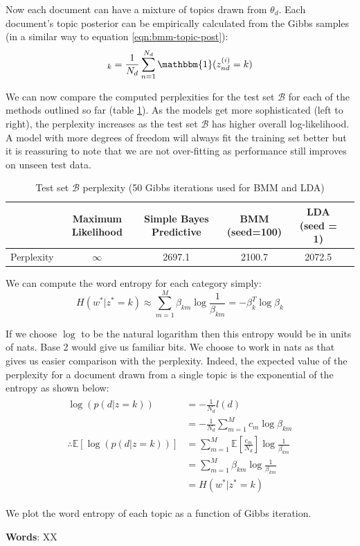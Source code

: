 \documentclass[]{article}
\newcommand{\Bcal}{\mathcal{B}}
\newcommand{\Expect}{\mathbb{E}}
\begin{document}
Now each document can have a mixture of topics drawn from $\theta_d$. Each document's topic posterior can be empirically calculated from the Gibbs samples (in a similar way to equation \ref{eqn:bmm-topic-post}):
%
\begin{equation}
	[\theta^{(i)}_d]_k = \frac{1}{N_d} \sum_{n=1}^{N_d} \mathbbm{1}(z^{(i)}_{nd} = k)
\end{equation}

We can now compare the computed perplexities for the test set $\Bcal$ for each of the methods outlined so far (table \ref{tab:perplex-comp}). As the models get more sophisticated (left to right), the perplexity increases as the test set $\Bcal$ has higher overall log-likelihood. A model with more degrees of freedom will always fit the training set better but it is reassuring to note that we are not over-fitting as performance still improves on unseen test data.

\begin{table}[!h]
	\centering
	\begin{tabular}{c | c c c c c}
		& Maximum Likelihood & Simple Bayes Predictive & BMM (seed=100) & LDA (seed = 1) \\ \hline
		Perplexity & $\infty$ & 2697.1 & 2100.7 & 2072.5 
	\end{tabular}
\caption{Test set $\Bcal$ perplexity (50 Gibbs iterations used for BMM and LDA)}
\label{tab:perplex-comp}
\end{table}

We can compute the word entropy for each category simply:
%
\begin{equation}
	H(w^* | z^* = k) \approx \sum_{m=1}^{M} \beta_{km} \log \frac{1}{\beta_{km}} = - \beta_k^T \log \beta_k
\end{equation}

If we choose $\log$ to be the natural logarithm then this entropy would be in units of nats. Base 2 would give us familiar bits. We choose to work in nats as that gives us easier comparison with the perplexity. Indeed, the expected value of the perplexity for a document drawn from a single topic is the exponential of the entropy as shown below:
%
\begin{align}
\begin{split}
	\log(p(d|z=k)) &= - \frac{1}{N_d} l(d) \\
	&= - \frac{1}{N_d} \sum_{m=1}^{M} c_m \log \beta_{km} \\
	\therefore \Expect [\log(p(d|z=k))] &= \sum_{m=1}^{M} \Expect \left[ \frac{c_m}{N_d} \right] \log \frac{1}{\beta_{km}} \\
	&= \sum_{m=1}^{M} \beta_{km} \log \frac{1}{\beta_{km}} \\
	&= H(w^* | z^* = k)
\end{split}
\end{align}

We plot the word entropy of each topic as a function of Gibbs iteration.

\textbf{Words}: XX
\end{document}
